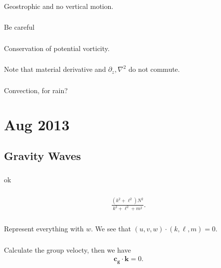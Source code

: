 \documentclass[11pt,letterpaper]{book}
\theoremstyle{definition}
\newcommand{\pe}{\partial}
\newcommand{\ve}[1]{\boldsymbol{#1}}
\begin{document}
\subsection{}
Geostrophic and no vertical motion.

\subsection{}
Be careful

\subsection{}
Conservation of potential vorticity.

\subsection{}
Note that material derivative and $\pe_z, \nabla^2$ do not commute.

\subsection{}
Convection, for rain?

\chapter{Aug 2013}
\section{Gravity Waves}
\subsection{}
ok

\subsection{}
\begin{align*}
    \frac{(k^2+\ell^2)N^2}{k^2+\ell^2+m^2}.
\end{align*}

\subsection{}
Represent everything with $w$. We see that $(u,v,w)\cdot(k,\ell,m) = 0$.

\subsection{}
Calculate the group velocty, then we have
\begin{align*}
    \ve{c_g}\cdot \ve k = 0.
\end{align*}
\end{document}
